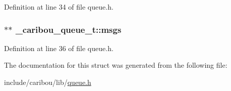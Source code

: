 Definition at line 34 of file queue.\-h.

\hypertarget{struct__caribou__queue__t_ab8bca88f308064d85e3984e7309a60a3}{
\subsubsection[{msgs}]{$\ast$$\ast$ \-\_\-caribou\-\_\-queue\-\_\-t\-::msgs}}\label{struct__caribou__queue__t_ab8bca88f308064d85e3984e7309a60a3}


Definition at line 36 of file queue.\-h.



The documentation for this struct was generated from the following file\-:\begin{DoxyCompactItemize}
\item 
include/caribou/lib/\hyperlink{queue_8h}{queue.\-h}\end{DoxyCompactItemize}
